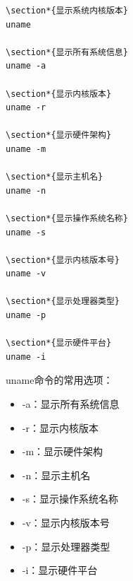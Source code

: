 \documentclass[12pt,UTF8]{ctexbook}
\begin{document}
\begin{verbatim}
\section*{显示系统内核版本}
uname

\section*{显示所有系统信息}
uname -a

\section*{显示内核版本}
uname -r

\section*{显示硬件架构}
uname -m

\section*{显示主机名}
uname -n

\section*{显示操作系统名称}
uname -s

\section*{显示内核版本号}
uname -v

\section*{显示处理器类型}
uname -p

\section*{显示硬件平台}
uname -i
\end{verbatim}

uname命令的常用选项：
\begin{itemize}
    \item -a：显示所有系统信息
    \item -r：显示内核版本
    \item -m：显示硬件架构
    \item -n：显示主机名
    \item -s：显示操作系统名称
    \item -v：显示内核版本号
    \item -p：显示处理器类型
    \item -i：显示硬件平台
\end{itemize}
\end{document}
